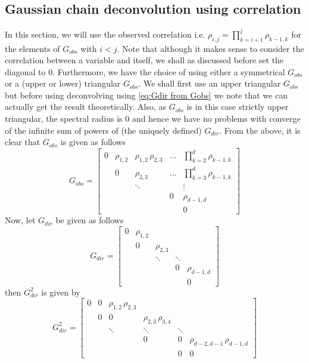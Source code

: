\documentclass[../Thesis.tex]{subfiles}
\begin{document}
\subsection{Gaussian chain deconvolution using correlation}
In this section, we will use the observed correlation i.e. $\rho_{i,j} = \prod_{k=i+1}^{j} \rho_{k-1,k}$ for the elements of $G_{obs}$ with $i< j$. Note that although it makes sense to consider the correlation between a variable and itself, we shall as discussed before set the diagonal to $0$. Furthermore, we have the choice of using either a symmetrical $G_{obs}$ or a (upper or lower) triangular $G_{obs}$. We shall first use an upper triangular $G_{obs}$ but before using deconvolving using \autoref{eq:Gdir from Gobs} we note that we can actually get the result theoretically. Also, as $G_{obs}$ is in this case strictly upper triangular, the spectral radius is $0$ and hence we have no problems with converge of the infinite sum of powers of (the uniquely defined) $G_{dir}$. From the above, it is clear that $G_{obs}$ is given as follows
$$G_{obs} = \begin{bmatrix}
        0 & \rho_{1,2} & \rho_{1,2}\,\rho_{2,3} & \dots & \prod_{k=2}^{d} \rho_{k-1,k} \\
          & 0          & \rho_{2,3}             & \dots & \prod_{k=3}^{d} \rho_{k-1,k} \\
          &            & \ddots                 &       & \vdots                       \\
          &            &                        & 0     & \rho_{d-1,d}                 \\
          &            &                        &       & 0
    \end{bmatrix}$$
Now, let $G_{dir}$ be given as follows
$$G_{dir} = \begin{bmatrix}
        0 & \rho_{1,2} &            &        &              \\
          & 0          & \rho_{2,3} &        &              \\
          &            & \ddots     & \ddots &              \\
          &            &            & 0      & \rho_{d-1,d} \\
          &            &            &        & 0
    \end{bmatrix}$$
then $G_{dir}^2$ is given by
$$G_{dir}^2 = \begin{bmatrix}
        0 & 0 & \rho_{1,2}   \, \rho_{2,3} &                          &        &                               \\
          & 0 & 0                          & \rho_{2,3} \, \rho_{3,4} &        &                               \\
          &   & \ddots                     & \ddots                   & \ddots &                               \\
          &   &                            & 0                        & 0      & \rho_{d-2,d-1}\, \rho_{d-1,d} \\
          &   &                            &                          & 0      & 0
    \end{bmatrix}$$
\end{document}
